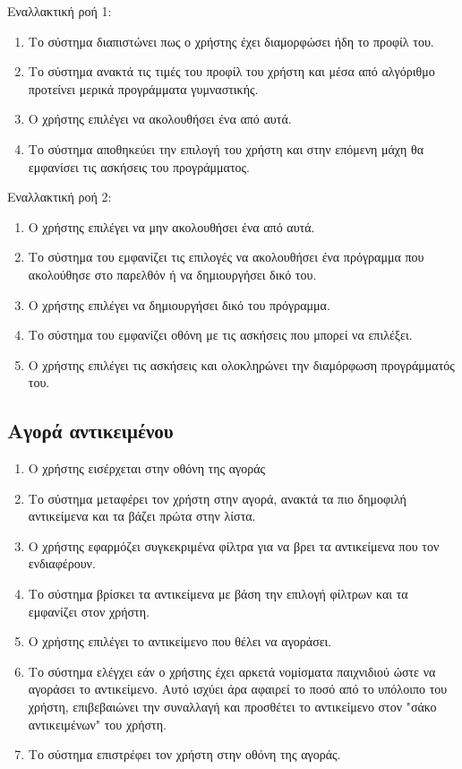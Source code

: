 Εναλλακτική ροή 1:
\begin{enumerate}[label=2.\alph*.,ref=2.\alph*]


    \item Το σύστημα διαπιστώνει πως ο χρήστης έχει διαμορφώσει ήδη το προφίλ του.
    \item Το σύστημα ανακτά τις τιμές του προφίλ του χρήστη και μέσα από αλγόριθμο προτείνει μερικά προγράμματα γυμναστικής.
    \item Ο χρήστης επιλέγει να ακολουθήσει ένα από αυτά.
    \item Το σύστημα αποθηκεύει την επιλογή του χρήστη και στην επόμενη μάχη θα εμφανίσει τις ασκήσεις του προγράμματος.
\end{enumerate}

Εναλλακτική ροή 2:
\begin{enumerate}[label=5.\alph*.,ref=2.\alph*]
    \item Ο χρήστης επιλέγει να μην ακολουθήσει ένα από αυτά.
    \item Το σύστημα του εμφανίζει τις επιλογές να ακολουθήσει ένα πρόγραμμα που ακολούθησε στο παρελθόν ή να δημιουργήσει δικό του.
    \item Ο χρήστης επιλέγει να δημιουργήσει δικό του πρόγραμμα.
    \item Το σύστημα του εμφανίζει οθόνη με τις ασκήσεις που μπορεί να επιλέξει.
    \item Ο χρήστης επιλέγει τις ασκήσεις και ολοκληρώνει την διαμόρφωση προγράμματός του.
\end{enumerate}

\newpage
\subsection{Αγορά αντικειμένου}
\label{sec:buy}
\begin{enumerate}
    \item Ο χρήστης εισέρχεται στην οθόνη της αγοράς
    \item Το σύστημα μεταφέρει τον χρήστη στην αγορά, ανακτά τα πιο δημοφιλή αντικείμενα και τα βάζει πρώτα στην λίστα.
    \item Ο χρήστης εφαρμόζει συγκεκριμένα φίλτρα για να βρει τα αντικείμενα που τον ενδιαφέρουν.
    \item Το σύστημα βρίσκει τα αντικείμενα με βάση την επιλογή φίλτρων και τα εμφανίζει στον χρήστη.
    \item Ο χρήστης επιλέγει το αντικείμενο που θέλει να αγοράσει.
    \item Το σύστημα ελέγχει εάν ο χρήστης έχει αρκετά νομίσματα παιχνιδιού ώστε να αγοράσει το αντικείμενο. Αυτό ισχύει άρα αφαιρεί το ποσό από το υπόλοιπο του χρήστη, επιβεβαιώνει την συναλλαγή και προσθέτει το αντικείμενο στον "σάκο αντικειμένων" του χρήστη.
    \item Το σύστημα επιστρέφει τον χρήστη στην οθόνη της αγοράς.
\end{enumerate}

